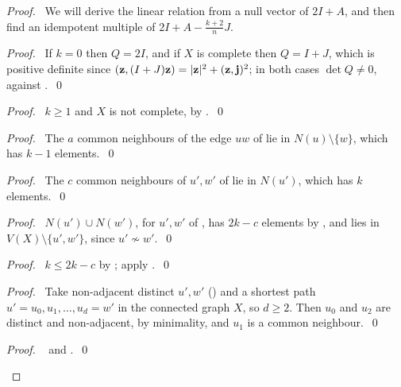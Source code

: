 \begin{proof}
 \pfsketch\ We will derive the linear relation from a null vector of $2I+A$, and then find an
 idempotent multiple of $2I+A-\frac{k+2}nJ$.
 \begin{proof}\pf\ If $k=0$ then $Q=2I$, and if $X$ is complete then $Q=I+J$, which is positive
  definite since $({\mathbf z},(I+J){\mathbf z})=|{\mathbf z}|^2+({\mathbf z},{\mathbf j})^2$; in both cases $\det Q\ne0$, against
  .~\qed\end{proof}
 \begin{proof}\pf\ $k\ge1$ and $X$ is not complete, by .~\qed\end{proof}
 \begin{proof}\pf\ The $a$ common neighbours of the edge $uw$ of  lie in
  $N(u)\setminus\{w\}$, which has $k-1$ elements.~\qed\end{proof}
 \begin{proof}\pf\ The $c$ common neighbours of $u',w'$ of  lie in $N(u')$,
  which has $k$ elements.~\qed\end{proof}
 \begin{proof}\pf\ $N(u')\cup N(w')$, for $u',w'$ of , has $2k-c$ elements by
  , and lies in
  $V(X)\setminus\{u',w'\}$, since $u'\not\sim w'$.~\qed\end{proof}
 \begin{proof}\pf\ $k\le2k-c$ by ; apply .~\qed\end{proof}
 \begin{proof}\pf\ Take non-adjacent distinct $u',w'$ () and a shortest path
  $u'=u_0,u_1,\dots,u_d=w'$ in the connected graph $X$, so $d\ge2$. Then $u_0$ and $u_2$ are
  distinct and non-adjacent, by minimality, and $u_1$ is a common
  neighbour.~\qed\end{proof}
 \begin{proof}\raggedright\pf\  and
  .~\qed\end{proof}

\end{proof}
